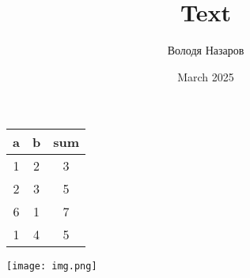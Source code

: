 \documentclass{article}
\title{Text}
\author{Володя Назаров}
\date{March 2025}
\begin{document}
\begin{table}[h]
    \centering
    \begin{tabular}{| c | c | c |}
    \hline
    a & b & sum \\
    \hline
    1 & 2 & 3 \\
    \hline
    2 & 3 & 5 \\
    \hline
    6 & 1 & 7 \\
    \hline
    1 & 4 & 5 \\
    \hline
    \end{tabular}
\end{table}

\texttt{[image: img.png]}
\end{document}

